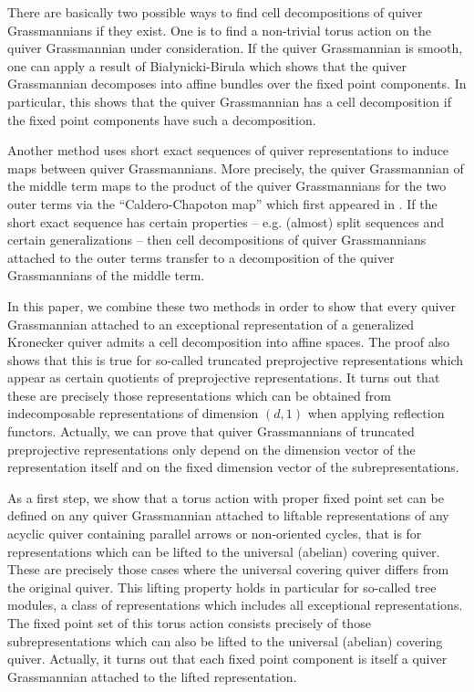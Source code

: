 \documentclass{amsart}
\numberwithin{equation}{section}
\begin{document}
There are basically two possible ways to find cell decompositions of quiver Grassmannians if they exist.
One is to find a non-trivial torus action on the quiver Grassmannian under consideration.
If the quiver Grassmannian is smooth, one can apply a result of Bia\l{}ynicki-Birula \cite{bb} which shows that the quiver Grassmannian decomposes into affine bundles over the fixed point components.
In particular, this shows that the quiver Grassmannian has a cell decomposition if the fixed point components have such a decomposition.

Another method uses short exact sequences of quiver representations to induce maps between quiver Grassmannians.
More precisely, the quiver Grassmannian of the middle term maps to the product of the quiver Grassmannians for the two outer terms via the ``Caldero-Chapoton map'' which first appeared in \cite{cc}. 
If the short exact sequence has certain properties -- e.g. (almost) split sequences and certain generalizations -- then cell decompositions of quiver Grassmannians attached to the outer terms transfer to a decomposition of the quiver Grassmannians of the middle term.

In this paper, we combine these two methods in order to show that every quiver Grassmannian attached to an exceptional representation of a generalized Kronecker quiver admits a cell decomposition into affine spaces.
The proof also shows that this is true for so-called truncated preprojective representations which appear as certain quotients of preprojective representations.
It turns out that these are precisely those representations which can be obtained from indecomposable representations of dimension $(d,1)$ when applying reflection functors.
Actually, we can prove that quiver Grassmannians of truncated preprojective representations only depend on the dimension vector of the representation itself and on the fixed dimension vector of the subrepresentations.

As a first step, we show that a torus action with proper fixed point set can be defined on any quiver Grassmannian attached to liftable representations of any acyclic quiver containing parallel arrows or non-oriented cycles, that is for representations which can be lifted to the universal (abelian) covering quiver.
These are precisely those cases where the universal covering quiver differs from the original quiver.
This lifting property holds in particular for so-called tree modules, a class of representations which includes all exceptional representations.
The fixed point set of this torus action consists precisely of those subrepresentations which can also be lifted to the universal (abelian) covering quiver.
Actually, it turns out that each fixed point component is itself a quiver Grassmannian attached to the lifted representation.
\end{document}
